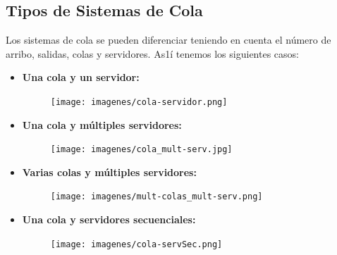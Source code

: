 \documentclass{article}
\begin{document}
\subsection{Tipos de Sistemas de Cola}
Los sistemas de cola se pueden diferenciar teniendo en cuenta el número de arribo, salidas, colas y servidores. As1í tenemos los siguientes casos:
\begin{itemize}
    \item \textbf{Una cola y un servidor:}
    \begin{figure}[H]
        \centering
        \texttt{[image: imagenes/cola-servidor.png]}
    \end{figure}

    \item \textbf{Una cola y múltiples servidores:}
    \begin{figure}[H]
        \centering
        \texttt{[image: imagenes/cola\_mult-serv.jpg]}
    \end{figure}

    \item \textbf{Varias colas y múltiples servidores:}
    \begin{figure}[H]
        \centering
        \texttt{[image: imagenes/mult-colas\_mult-serv.png]}
    \end{figure}

    \item \textbf{Una cola y servidores secuenciales:}
    \begin{figure}[H]
        \centering
        \texttt{[image: imagenes/cola-servSec.png]}
    \end{figure}
\end{itemize}
\end{document}
